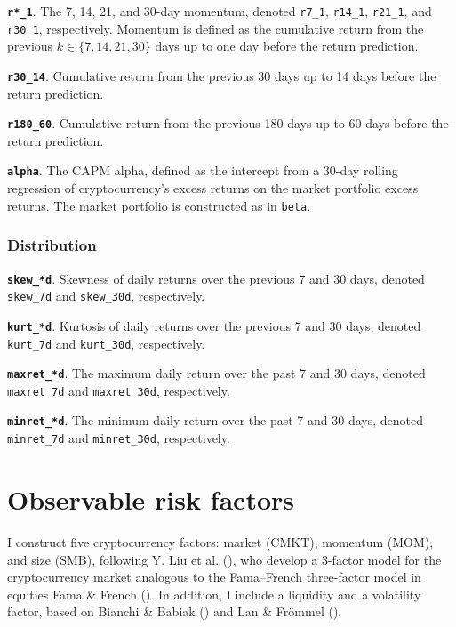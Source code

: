 \documentclass[
  12pt,
  a4paper,
  openany]{scrbook}
\begin{document}
\textbf{\texttt{r*\_1}}. The 7, 14, 21, and 30-day momentum, denoted
\texttt{r7\_1}, \texttt{r14\_1}, \texttt{r21\_1}, and \texttt{r30\_1},
respectively. Momentum is defined as the cumulative return from the
previous \(k \in \{7, 14, 21, 30\}\) days up to one day before the
return prediction.

\textbf{\texttt{r30\_14}}. Cumulative return from the previous 30 days
up to 14 days before the return prediction.

\textbf{\texttt{r180\_60}}. Cumulative return from the previous 180 days
up to 60 days before the return prediction.

\textbf{\texttt{alpha}}. The CAPM alpha, defined as the intercept from a
30-day rolling regression of cryptocurrency's excess returns on the
market portfolio excess returns. The market portfolio is constructed as
in \texttt{beta}.

\subsubsection{Distribution}\label{distribution}

\textbf{\texttt{skew\_*d}}. Skewness of daily returns over the previous
7 and 30 days, denoted \texttt{skew\_7d} and \texttt{skew\_30d},
respectively.

\textbf{\texttt{kurt\_*d}}. Kurtosis of daily returns over the previous
7 and 30 days, denoted \texttt{kurt\_7d} and \texttt{kurt\_30d},
respectively.

\textbf{\texttt{maxret\_*d}}. The maximum daily return over the past 7
and 30 days, denoted \texttt{maxret\_7d} and \texttt{maxret\_30d},
respectively.

\textbf{\texttt{minret\_*d}}. The minimum daily return over the past 7
and 30 days, denoted \texttt{minret\_7d} and \texttt{minret\_30d},
respectively.

\section{Observable risk factors}\label{sec-obs_factors}

I construct five cryptocurrency factors: market (CMKT), momentum (MOM),
and size (SMB), following Y. Liu et al.
(), who develop a 3-factor model
for the cryptocurrency market analogous to the Fama--French three-factor
model in equities Fama \& French
(). In addition, I include a
liquidity and a volatility factor, based on Bianchi \& Babiak
() and Lan \& Frömmel
().
\end{document}
